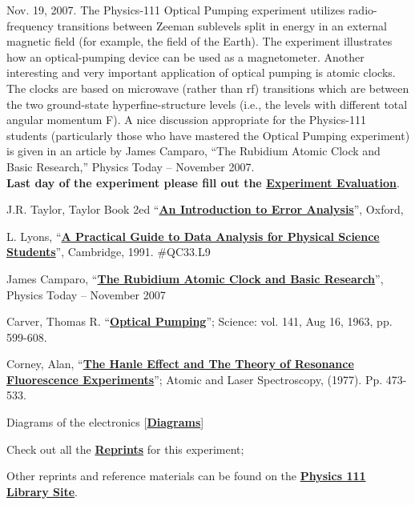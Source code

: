 \documentclass{../lab}
\newcommand{\PhysicsLibrarySite}{http://physics111.lib.berkeley.edu/Physics111/Reprints/OPT/OPT_index.html}
\newcommand{\OPTReprints}{http://physics111.lib.berkeley.edu/Physics111/Reprints/OPT/OPT_index.html}
\newcommand{\ErrorAnalysis}{http://physics111.lib.berkeley.edu/Physics111/Reprints/Data\%20Analysis\%20Book\%20PDF/Introduction_To_Error_Analysis_Taylor_John.pdf}
\newcommand{\DataAnalysis}{http://physics111.lib.berkeley.edu/Physics111/Reprints/Data\%20Analysis\%20Book\%20PDF/Error\%20Analysis\%20Book-Louis\%20Lyons.pdf}
\newcommand{\OpticalPumpingCarver}{http://physics111.lib.berkeley.edu/Physics111/Reprints/OPT/03-Optical_Pumping-Carver.pdf}
\newcommand{\HanleEffect}{http://physics111.lib.berkeley.edu/Physics111/Reprints/OPT/07-Hanle_Effect.pdf}
\newcommand{\Diagrams}{http://physics111.lib.berkeley.edu/Physics111/Reprints/OPT/01-diagrams.pdf}
\begin{document}
Nov. 19, 2007. The Physics-111 Optical Pumping experiment utilizes radio-frequency transitions between Zeeman sublevels split in energy in an external magnetic field (for example, the field of the Earth). The experiment illustrates how an optical-pumping device can be used as a magnetometer. Another interesting and very important application of optical pumping is atomic clocks. The clocks are based on microwave (rather than rf) transitions which are between the two ground-state hyperfine-structure levels (i.e., the levels with different total angular momentum F). A nice discussion appropriate for the Physics-111 students (particularly those who have mastered the Optical Pumping experiment) is given in an article by James Camparo, ``The Rubidium Atomic Clock and Basic Research,'' Physics Today -- November 2007. \\

\noindent\textbf{Last day of the experiment please fill out the \href{\ExperimentEvaluation}{\textbf{Experiment Evaluation}}}.

\begin{thebibliography}{}
\label{references}
J.R. Taylor, Taylor Book 2ed ``\href{\ErrorAnalysis}{\textbf{An Introduction to Error Analysis}}'', Oxford,

L. Lyons, ``\href{\DataAnalysis}{\textbf{A Practical Guide to Data Analysis for Physical Science Students}}'', Cambridge, 1991. \#QC33.L9

James Camparo, ``\href{http://physics111.lib.berkeley.edu/Physics111/Reprints/OPT/Camparo,PhysTodayNov(07)33-Rb\%20Atomic\%20Clock.pdf}{\textbf{The Rubidium Atomic Clock and Basic Research}}'', Physics Today -- November 2007

Carver, Thomas R. ``\href{\OpticalPumpingCarver}{\textbf{Optical Pumping}}''; Science: vol. 141, Aug 16, 1963, pp. 599-608.

Corney, Alan, ``\href{\HanleEffect}{\textbf{The Hanle Effect and The Theory of Resonance Fluorescence Experiments}}''; Atomic and Laser Spectroscopy, (1977). Pp. 473-533.

Diagrams of the electronics [\href{\Diagrams}{\textbf{Diagrams}}]

Check out all the \href{\OPTReprints}{\textbf{Reprints}} for this experiment;
\end{thebibliography}

\vspace{1em}
\noindent Other reprints and reference materials can be found on the \href{\PhysicsLibrarySite}{\textbf{Physics 111 Library Site}}.
\end{document}

